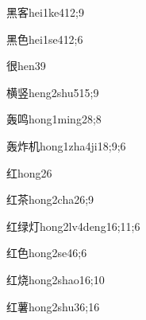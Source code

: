 \begin{verbete}{黑客}{hei1ke4}{12;9}
\end{verbete}

\begin{verbete}{黑色}{hei1se4}{12;6}
\end{verbete}

\begin{verbete}{很}{hen3}{9}
\end{verbete}

\begin{verbete}{横竖}{heng2shu5}{15;9}
\end{verbete}

\begin{verbete}{轰鸣}{hong1ming2}{8;8}
\end{verbete}

\begin{verbete}{轰炸机}{hong1zha4ji1}{8;9;6}
\end{verbete}

\begin{verbete}{红}{hong2}{6}
\end{verbete}

\begin{verbete}{红茶}{hong2cha2}{6;9}
\end{verbete}

\begin{verbete}{红绿灯}{hong2lv4deng1}{6;11;6}
\end{verbete}

\begin{verbete}{红色}{hong2se4}{6;6}
\end{verbete}

\begin{verbete}{红烧}{hong2shao1}{6;10}
\end{verbete}

\begin{verbete}{红薯}{hong2shu3}{6;16}
\end{verbete}

